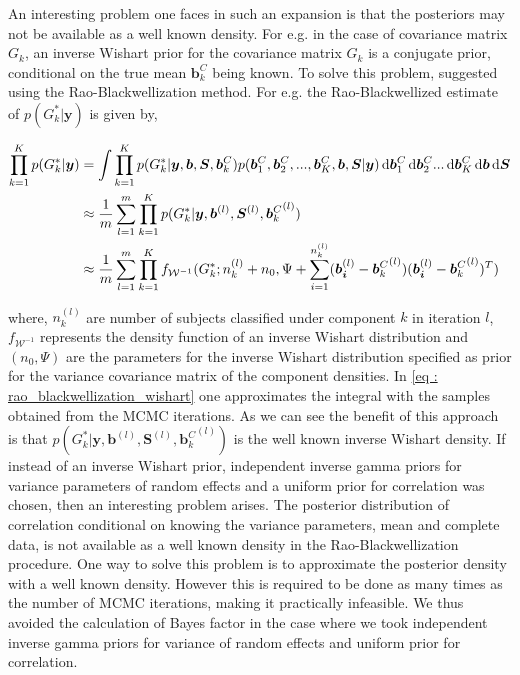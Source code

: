 An interesting problem one faces in such an expansion is that the posteriors may not be available as a well known density. For e.g. in the case of covariance matrix $G_k$, an inverse Wishart prior for the covariance matrix $G_k$ is a conjugate prior, conditional on the true mean $\boldsymbol{b}_k^C$ being known. To solve this problem, \citet{chib_marginal_1995} suggested using the Rao-Blackwellization method. For e.g. the Rao-Blackwellized estimate of $p(G_k^*|\boldsymbol{y})$ is given by,

\begin{equation}
\label{eq : rao_blackwellization_wishart}
\begin{split}
\prod_{k=1}^K p(G_k^*|\boldsymbol{y}) & = \int \prod_{k=1}^{K} p(G_k^*| \boldsymbol{y}, \boldsymbol{b}, \boldsymbol{S}, \boldsymbol{b}_k^C) p(\boldsymbol{b}_1^C, \boldsymbol{b}_2^C,..., \boldsymbol{b}_K^C,\boldsymbol{b}, \boldsymbol{S}|\boldsymbol{y}) 
\mathop{}\!\mathrm{d}{\boldsymbol{b}_1^C} \mathop{}\!\mathrm{d}{\boldsymbol{b}_2^C} ... \mathop{}\!\mathrm{d}{\boldsymbol{b}_K^C} \mathop{}\!\mathrm{d}{\boldsymbol{b}} \mathop{}\!\mathrm{d}{\boldsymbol{S}}\\
& \approx \frac 1 m \sum_{l=1}^m \prod_{k=1}^{K} p(G_k^*| \boldsymbol{y}, \boldsymbol{b}^{(l)}, \boldsymbol{S}^{(l)}, {\boldsymbol{b}_k^C}^{(l)
})\\
& \approx \frac 1 m \sum_{l=1}^m \prod_{k=1}^{K} f_{\mathcal{W}^{-1}}(G_k^*; n_k^{(l)}+n_0, \Psi + \sum_{i=1}^{n_k^{(l)}}(\boldsymbol{b_i}^{(l)} - {\boldsymbol{b}_k^C}^{(l)})(\boldsymbol{b_i}^{(l)} - {\boldsymbol{b}_k^C}^{(l)})^T)
\end{split}
\end{equation}

where, $n_k^{(l)}$ are number of subjects classified under component $k$ in iteration $l$, $f_{\mathcal{W}^{-1}}$ represents the density function of an inverse Wishart distribution and $(n_0, \Psi)$ are the parameters for the inverse Wishart distribution specified as prior for the variance covariance matrix of the component densities. In \ref{eq : rao_blackwellization_wishart} one approximates the integral with the samples obtained from the MCMC iterations. As we can see the benefit of this approach is that $p(G_k^*| \boldsymbol{y}, \boldsymbol{b}^{(l)}, \boldsymbol{S}^{(l)}, {\boldsymbol{b}_k^C}^{(l)})$ is the well known inverse Wishart density. If instead of an inverse Wishart prior, independent inverse gamma priors for variance parameters of random effects and a uniform prior for correlation was chosen, then an interesting problem arises. The posterior distribution of correlation conditional on knowing the variance parameters, mean and complete data, is not available as a well known density in the Rao-Blackwellization procedure. One way to solve this problem is to approximate the posterior density with a well known density. However this is required to be done as many times as the number of MCMC iterations, making it practically infeasible. We thus avoided the calculation of Bayes factor in the case where we took independent inverse gamma priors for variance of random effects and uniform prior for correlation.\\


